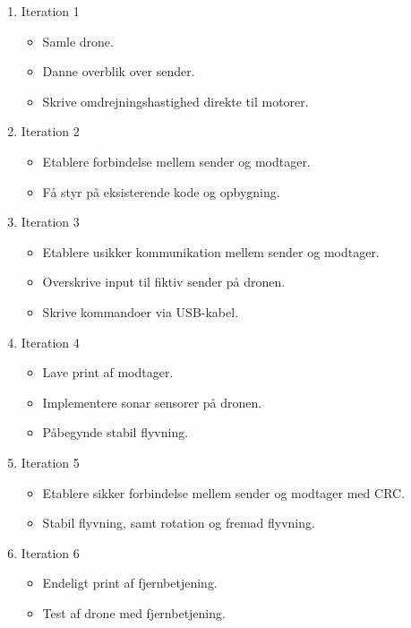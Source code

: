\documentclass[Main]{subfiles}
\begin{document}
\begin{enumerate}
\item[] Iteration 1
	\vspace{-10pt}
	\begin{itemize}
	\item Samle drone.
	\item Danne overblik over sender.
	\item Skrive omdrejningshastighed direkte til motorer.
	\end{itemize}
	
\item[] Iteration 2
	\vspace{-10pt}
	\begin{itemize}
	\item Etablere forbindelse mellem sender og modtager.
	\item Få styr på eksisterende kode og opbygning.
	\end{itemize}
	
\item[] Iteration 3
	\vspace{-10pt}
	\begin{itemize}
	\item Etablere usikker kommunikation mellem sender og modtager.
	\item Overskrive input til fiktiv sender på dronen.
	\item Skrive kommandoer via USB-kabel.
	\end{itemize}

\item[] Iteration 4
	\vspace{-10pt}
	\begin{itemize}
	\item Lave print af modtager.
	\item Implementere sonar sensorer på dronen.
	\item Påbegynde stabil flyvning.
	\end{itemize}
	
\item[] Iteration 5
	\vspace{-10pt}
	\begin{itemize}
	\item Etablere sikker forbindelse mellem sender og modtager med CRC.
	\item Stabil flyvning, samt rotation og fremad flyvning.
	\end{itemize}
	
\item[] Iteration 6
	\vspace{-10pt}
	\begin{itemize}
	\item Endeligt print af fjernbetjening.
	\item Test af drone med fjernbetjening.
	\end{itemize}

\end{enumerate}
\end{document}
